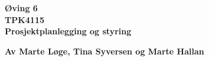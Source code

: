 \begin{titlepage}
\begin{center}

{\Huge \bf Øving 6} \\[2.0cm]
{\Huge \bf TPK4115} \\[2.0cm]
{\LARGE \bf Prosjektplanlegging og styring} \\[1.0cm]
\vspace{13cm}

{\bf Av Marte Løge, Tina Syversen og Marte Hallan}


\end{center}
\end{titlepage}